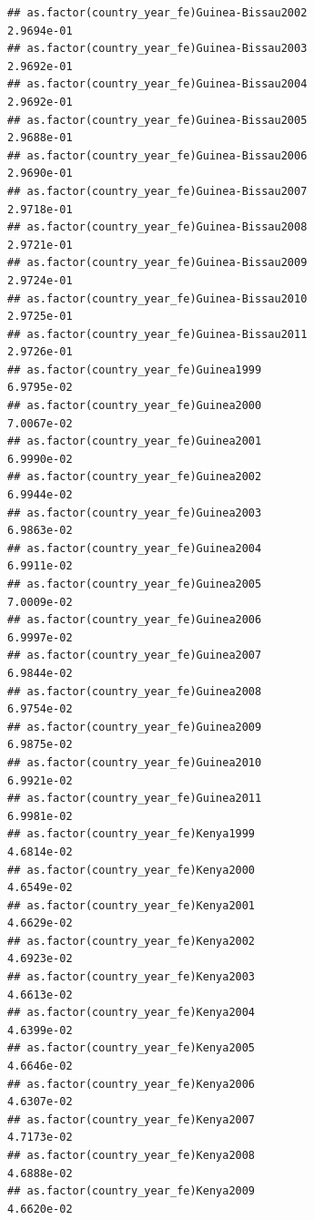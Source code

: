 \documentclass[
  a4paper,
]{article}
\begin{document}
\begin{verbatim}
## as.factor(country_year_fe)Guinea-Bissau2002                     2.9694e-01
## as.factor(country_year_fe)Guinea-Bissau2003                     2.9692e-01
## as.factor(country_year_fe)Guinea-Bissau2004                     2.9692e-01
## as.factor(country_year_fe)Guinea-Bissau2005                     2.9688e-01
## as.factor(country_year_fe)Guinea-Bissau2006                     2.9690e-01
## as.factor(country_year_fe)Guinea-Bissau2007                     2.9718e-01
## as.factor(country_year_fe)Guinea-Bissau2008                     2.9721e-01
## as.factor(country_year_fe)Guinea-Bissau2009                     2.9724e-01
## as.factor(country_year_fe)Guinea-Bissau2010                     2.9725e-01
## as.factor(country_year_fe)Guinea-Bissau2011                     2.9726e-01
## as.factor(country_year_fe)Guinea1999                            6.9795e-02
## as.factor(country_year_fe)Guinea2000                            7.0067e-02
## as.factor(country_year_fe)Guinea2001                            6.9990e-02
## as.factor(country_year_fe)Guinea2002                            6.9944e-02
## as.factor(country_year_fe)Guinea2003                            6.9863e-02
## as.factor(country_year_fe)Guinea2004                            6.9911e-02
## as.factor(country_year_fe)Guinea2005                            7.0009e-02
## as.factor(country_year_fe)Guinea2006                            6.9997e-02
## as.factor(country_year_fe)Guinea2007                            6.9844e-02
## as.factor(country_year_fe)Guinea2008                            6.9754e-02
## as.factor(country_year_fe)Guinea2009                            6.9875e-02
## as.factor(country_year_fe)Guinea2010                            6.9921e-02
## as.factor(country_year_fe)Guinea2011                            6.9981e-02
## as.factor(country_year_fe)Kenya1999                             4.6814e-02
## as.factor(country_year_fe)Kenya2000                             4.6549e-02
## as.factor(country_year_fe)Kenya2001                             4.6629e-02
## as.factor(country_year_fe)Kenya2002                             4.6923e-02
## as.factor(country_year_fe)Kenya2003                             4.6613e-02
## as.factor(country_year_fe)Kenya2004                             4.6399e-02
## as.factor(country_year_fe)Kenya2005                             4.6646e-02
## as.factor(country_year_fe)Kenya2006                             4.6307e-02
## as.factor(country_year_fe)Kenya2007                             4.7173e-02
## as.factor(country_year_fe)Kenya2008                             4.6888e-02
## as.factor(country_year_fe)Kenya2009                             4.6620e-02

\end{verbatim}
\end{document}
